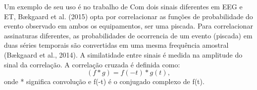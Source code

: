 Um exemplo de seu uso é no trabalho de Com dois sinais diferentes em EEG e ET, Bækgaard et al. (2015) opta por correlacionar as funções de probabilidade do evento observado em 
ambos os equipamentos, ser uma piscada. 
Para correlacionar assinaturas diferentes, as probabilidades de ocorrencia de um evento (piscada) em duas séries temporais são convertidas em uma mesma frequência amostral (Bækgaard et al., 2014).
A similatidade entre sinais é medida na amplitude do sinal da correlação. A correlação cruzada é definida como:
\begin{equation}\label{eq:correlação cruzada}
    (f * g) = f(-t)*g(t), 
    \end{equation}
onde * significa convolução e f(-t) é o conjugado complexo de f(t).


